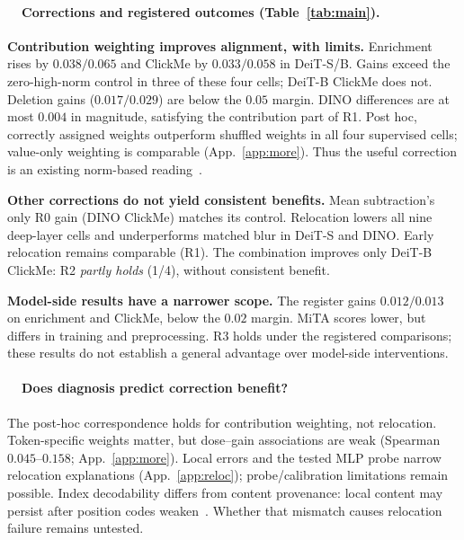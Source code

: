 \documentclass{article}
\newcommand{\rsub}[1]{\refstepcounter{subsection}\paragraph{\thesubsection~~#1}}
\begin{document}
\begin{table}[t]
\caption{Layers 9--12; all metrics $\uparrow$. Arrows: higher/lower versus received attention under the registered rule (model-side rows: DeiT-S). $\diamond$: higher than the matched control. \textbf{Bold}: higher than both. Controls are indented. GAE~\citep{chefer2021generic} uses gradients and is a descriptive reference. Enr.: enrichment; Click.: ClickMe; Del.: deletion.}
\label{tab:main}
\centering\footnotesize
\setlength{\tabcolsep}{2.6pt}\renewcommand{\arraystretch}{1.0}

\end{table}

\rsub{Corrections and registered outcomes (Table~\ref{tab:main}).}
\textbf{Contribution weighting improves alignment, with limits.} Enrichment rises by $0.038/0.065$ and ClickMe by $0.033/0.058$ in DeiT-S/B. Gains exceed the zero-high-norm control in three of these four cells; DeiT-B ClickMe does not. Deletion gains ($0.017/0.029$) are below the $0.05$ margin. DINO differences are at most $0.004$ in magnitude, satisfying the contribution part of R1. Post hoc, correctly assigned weights outperform shuffled weights in all four supervised cells; value-only weighting is comparable (App.~\ref{app:more}). Thus the useful correction is an existing norm-based reading~\citep{kobayashi2020,zhu2024}.

\begin{samepage}
\smallskip\noindent\textbf{Other corrections do not yield consistent benefits.} Mean subtraction's only R0 gain (DINO ClickMe) matches its control. Relocation lowers all nine deep-layer cells and underperforms matched blur in DeiT-S and DINO. Early relocation remains comparable (R1). The combination improves only DeiT-B ClickMe: R2 \emph{partly holds} (1/4), without consistent benefit.
\par
\end{samepage}

\smallskip\noindent\textbf{Model-side results have a narrower scope.} The register gains $0.012/0.013$ on enrichment and ClickMe, below the $0.02$ margin. MiTA scores lower, but differs in training and preprocessing. R3 holds under the registered comparisons; these results do not establish a general advantage over model-side interventions.

\rsub{Does diagnosis predict correction benefit?} The post-hoc correspondence holds for contribution weighting, not relocation. Token-specific weights matter, but dose--gain associations are weak (Spearman $0.045$--$0.158$; App.~\ref{app:more}). Local errors and the tested MLP probe narrow relocation explanations (App.~\ref{app:reloc}); probe/calibration limitations remain possible. Index decodability differs from content provenance: local content may persist after position codes weaken~\citep{raghu2021}. Whether that mismatch causes relocation failure remains untested.
\end{document}
